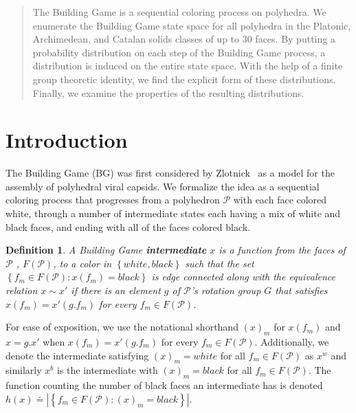 \documentclass[12pt]{article}
\newtheorem{mydef}{Definition}
\newcommand{\colorA}{white}
\newcommand{\colorB}{black}
\newcommand{\colorAsm}{w}
\newcommand{\colorBsm}{b}
\newcommand{\poly}{$\mathscr{P}$}
\newcommand{\faceset}{F\left(\mathscr{P}\right)}
\newcommand{\spc}{ }
\begin{document}
\maketitle

\begin{abstract}
The Building Game is a sequential coloring process on polyhedra. We enumerate the Building Game state space for all polyhedra in the Platonic, Archimedean, and Catalan solids classes of up to 30 faces. By putting a probability distribution on each step of the Building Game process, a distribution is induced on the entire state space. With the help of a finite group theoretic identity, we find the explicit form of these distributions. Finally, we examine the properties of the resulting distributions.
\end{abstract}

\section{Introduction}
The Building Game (BG) was first considered by Zlotnick~\cite{Zlotnick1994} as a model for the assembly of polyhedral viral capsids. We formalize the idea as a sequential coloring process that progresses from a polyhedron \poly\spc with each face colored \colorA, through a number of intermediate states each having a mix of \colorA\spc and \colorB\spc faces, and ending with all of the faces colored \colorB. 
\begin{mydef}
A Building Game \textbf{intermediate} $x$ is a function from the faces of \poly\spc, $F\left(\mathscr{P}\right)$, to a color in $\left\{\colorA,\colorB\right\}$ such that the set $\left\{f_m \in F\left(\mathscr{P}\right) : x\left(f_m\right) = \colorB\right\}$ is edge connected along with the equivalence relation $x \sim x'$ if there is an element $g$ of \poly's rotation group $G$ that satisfies $x(f_m) = x'(g.f_m)$ for every $f_m \in F(\mathscr{P})$. 
\end{mydef}
For ease of exposition, we use the notational shorthand $\left(x\right)_m$ for $x\left(f_m\right)$ and $x = g.x'$ when $x(f_m) = x'(g.f_m)$ for every $f_m \in F(\mathscr{P})$. Additionally, we denote the intermediate satisfying $\left(x\right)_m = \colorA$ for all $f_m \in \faceset$ as $x^\colorAsm$ and similarly $x^\colorBsm$ is the intermediate with $\left(x\right)_m = \colorB$ for all $f_m \in \faceset$. The function counting the number of \colorB\spc faces an intermediate has is denoted $h\left(x\right) \doteq |\left\{f_m \in \faceset : \left(x\right)_m = \colorB\right\}|$.
\end{document}
